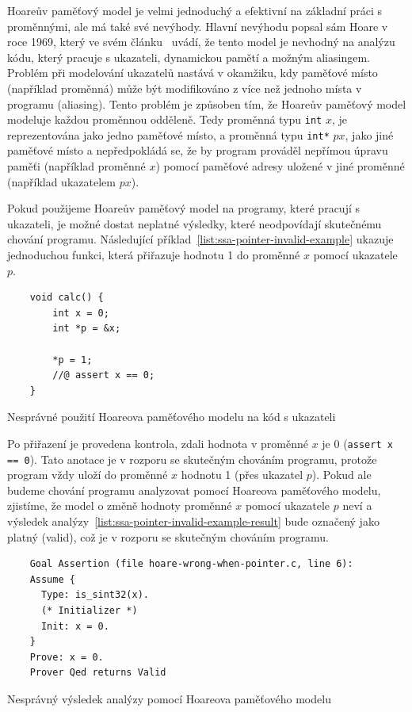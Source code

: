 
Hoareův paměťový model je velmi jednoduchý a efektivní na základní práci s proměnnými, ale má také své nevýhody.
Hlavní nevýhodu popsal sám Hoare v roce 1969, který ve svém článku~\cite{Hoare1969} uvádí,
že tento model je nevhodný na analýzu kódu, který pracuje s ukazateli, dynamickou pamětí a možným aliasingem.
Problém při modelování ukazatelů nastává v okamžiku,
kdy paměťové místo (například proměnná) může být modifikováno z více než jednoho místa v programu (aliasing).
Tento problém je způsoben tím, že Hoareův paměťový model modeluje každou proměnnou odděleně.
Tedy proměnná typu \texttt{int} $x$, je reprezentována jako jedno paměťové místo,
a proměnná typu \texttt{int*} $px$, jako jiné paměťové místo a nepředpokládá se,
že by program prováděl nepřímou úpravu paměťi (například proměnné $x$) pomocí paměťové adresy
uložené v jiné proměnné (například ukazatelem $px$).

Pokud použijeme Hoareův paměťový model na programy, které pracují s ukazateli,
je možné dostat neplatné výsledky, které neodpovídají skutečnému chování programu.
Následující příklad~\ref{list:ssa-pointer-invalid-example} ukazuje jednoduchou funkci,
která přiřazuje hodnotu 1 do proměnné $x$ pomocí ukazatele $p$.

\begin{listing}[H]
    \begin{verbatim}
    void calc() {
        int x = 0;
        int *p = &x;

        *p = 1;
        //@ assert x == 0;
    }
    \end{verbatim}
    \caption{Nesprávné použití Hoareova paměťového modelu na kód s ukazateli}
    \label{list:ssa-pointer-invalid-example}
\end{listing}

Po přiřazení je provedena kontrola, zdali hodnota v proměnné $x$ je 0 (\texttt{assert x == 0}).
Tato anotace je v rozporu se skutečným chováním programu,
protože program vždy uloží do proměnné $x$ hodnotu 1 (přes ukazatel $p$).
Pokud ale budeme chování programu analyzovat pomocí Hoareova paměťového modelu,
zjistíme, že model o změně hodnoty proměnné $x$ pomocí ukazatele $p$ neví
a výsledek analýzy~\ref{list:ssa-pointer-invalid-example-result} bude označený jako platný (valid),
což je v rozporu se skutečným chováním programu.

\begin{listing}[H]
    \begin{verbatim}
    Goal Assertion (file hoare-wrong-when-pointer.c, line 6):
    Assume {
      Type: is_sint32(x).
      (* Initializer *)
      Init: x = 0.
    }
    Prove: x = 0.
    Prover Qed returns Valid
    \end{verbatim}
    \caption{Nesprávný výsledek analýzy pomocí Hoareova paměťového modelu}
    \label{list:ssa-pointer-invalid-example-result}
\end{listing}

